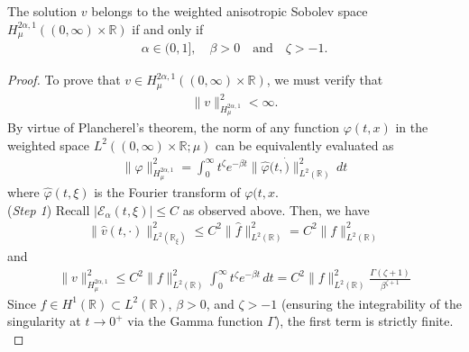 \documentclass[10pt,a4paper]{amsart}
\begin{document}
\begin{lemma}
The solution $v$ belongs to the weighted anisotropic Sobolev space $H^{2\alpha, 1}_\mu((0, \infty) \times \mathbb{R})$ if and only if 
\begin{align*}
\alpha \in (0,1], \quad \beta > 0 \quad \text{and} \quad \zeta > - 1.
\end{align*}
\end{lemma}

\begin{proof}
To prove that $v \in H^{2\alpha, 1}_\mu((0, \infty) \times \mathbb{R})$, we must verify that
\begin{align*}
\|v\|^2_{H^{2\alpha, 1}_\mu} < \infty.
\end{align*}
By virtue of Plancherel's theorem, the norm of any function $\varphi(t,x)$ in the weighted space $L^2((0, \infty)\times \mathbb{R}; \mu)$ can be equivalently evaluated as
\begin{align*}
\|\varphi\|^2_{H^{2\alpha, 1}_\mu} = \int_0^\infty t^\zeta e^{-\beta t} \|\hat{\varphi}(t, \dot)\|^2_{L^2(\mathbb{R})} \, dt
\end{align*}
where $\hat{\varphi}(t, \xi)$ is the Fourier transform of $\varphi(t,x$.\\


({\it Step 1}) Recall $|\mathcal{E}_\alpha(t, \xi)| \le C$ as observed above. Then, we have
\begin{align*}
\|\hat{v}(t, \cdot)\|^2_{L^2(\mathbb{R}_\xi)} \le C^2 \|\hat{f}\|^2_{L^2(\mathbb{R})} = C^2 \|f\|^2_{L^2(\mathbb{R})}
\end{align*}
and
\begin{align*}
\|v\|^2_{H^{2\alpha, 1}_\mu} \le C^2 \|f\|^2_{L^2(\mathbb{R})} \int_0^\infty t^\zeta e^{-\beta t} \, dt = C^2 \|f\|^2_{L^2(\mathbb{R})} \frac{\Gamma(\zeta + 1)}{\beta^{\zeta + 1}}
\end{align*}
Since $f \in H^1(\mathbb{R}) \subset L^2(\mathbb{R})$, $\beta > 0$, and $\zeta > -1$ (ensuring the integrability of the singularity at $t \to 0^+$ via the Gamma function $\Gamma$), the first term is strictly finite.\\


\end{proof}
\end{document}
